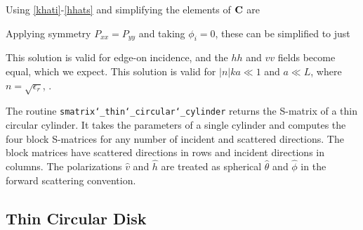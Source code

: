 
Using \eqref{khati}-\eqref{hhats} and simplifying the elements  of $\mathbf{C}$ are

Applying symmetry $P_{xx} = P_{yy}$ and taking $\phi_i = 0$, these can be simplified to just

This solution is valid for edge-on incidence, and the $hh$ and $vv$ fields become equal, which we expect.  This solution is valid for $\vert n \vert ka \ll 1$ and $a \ll L$, where $n = \sqrt{\epsilon_r}$, \cite{schiffer1979light}.

The routine \texttt{smatrix\char`_thin\char`_circular\char`_cylinder} returns the S-matrix of a thin circular cylinder. It takes the parameters of a single cylinder and computes the four block S-matrices for any number of incident and scattered directions. The block matrices have scattered directions in rows and incident directions in columns. The polarizations $\hat{v}$ and $\hat{h}$ are treated as spherical $\hat{\theta}$ and $\hat{\phi}$ in the forward scattering convention.

{\footnotesize
{}
}

\clearpage
\newpage

\subsection{Thin Circular Disk}

